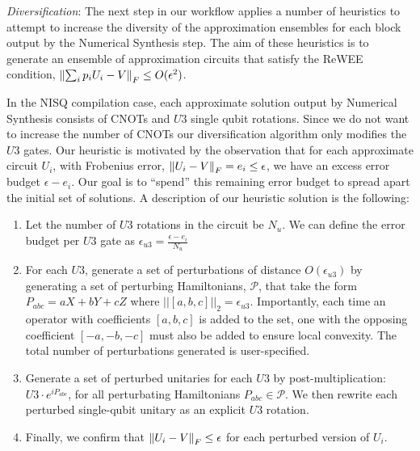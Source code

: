 \emph{Diversification}: The next step in our workflow applies a number of heuristics to attempt to increase the diversity of the approximation ensembles for each block output by the Numerical Synthesis step. The aim of these heuristics is to generate an ensemble of approximation circuits that satisfy the ReWEE condition, \ie $\left\lVert \sum_i p_i U_i - V \right\rVert_F\leq O(\epsilon^2)$. 

In the NISQ compilation case, each approximate solution output by Numerical Synthesis consists of CNOTs and $U3$ single qubit rotations. Since we do not want to increase the number of CNOTs our diversification algorithm only modifies the $U3$ gates. Our heuristic is motivated by the observation that for each approximate circuit $U_i$, with Frobenius error, $\left\lVert U_i - V \right\rVert_F = e_i \leq \epsilon$, we have an excess error budget $\epsilon - e_i$. Our goal is to ``spend'' this remaining error budget to spread apart the initial set of solutions. A description of our heuristic solution is the following:
\begin{enumerate}
    \item Let the number of $U3$ rotations in the circuit be $N_u$. We can define the error budget per $U3$ gate as $\epsilon_{u3} = \frac{\epsilon - e_i}{N_u}$
    \item For each $U3$, generate a set of perturbations of distance $O(\epsilon_{u3})$ by generating a set of perturbing Hamiltonians, $\mathcal{P}$, that take the form $P_{abc} = aX + bY + cZ$ where $||[a,b,c]||_2 = \epsilon_{u3}$. Importantly, each time an operator with coefficients $[a,b,c]$ is added to the set, one with the opposing coefficient $[-a,-b,-c]$ must also be added to ensure local convexity. The total number of perturbations generated is user-specified.
    \item Generate a set of perturbed unitaries for each $U3$ by post-multiplication: $U3 \cdot e^{i P_{abc}}$, for all perturbating Hamiltonians $P_{abc} \in \mathcal{P}$. We then rewrite each perturbed single-qubit unitary as an explicit $U3$ rotation.
    \item Finally, we confirm that $\left\lVert U_i-V \right\rVert_F \leq \epsilon$ for each perturbed version of $U_i$.
\end{enumerate}

